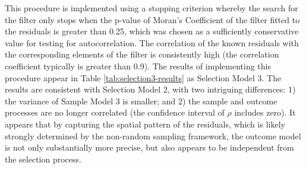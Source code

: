 \documentclass[]{elsarticle} %
\begin{document}
This procedure is implemented using a stopping criterion whereby the
search for the filter only stops when the p-value of Moran's Coefficient
of the filter fitted to the residuals is greater than 0.25, which was
chosen as a sufficiently conservative value for testing for
autocorrelation. The correlation of the known residuals with the
corresponding elements of the filter is consistently high (the
correlation coefficient typically is greater than 0.9). The results of
implementing this procedure appear in Table \ref{tab:selection3-results}
as Selection Model 3. The results are consistent with Selection Model 2,
with two intriguing differences: 1) the variance of Sample Model 3 is
smaller; and 2) the sample and outcome processes are no longer
correlated (the confidence interval of \(\rho\) includes zero). It
appears that by capturing the spatial pattern of the residuals, which is
likely strongly determined by the non-random sampling framework, the
outcome model is not only substantially more precise, but also appears
to be independent from the selection process.
\end{document}
